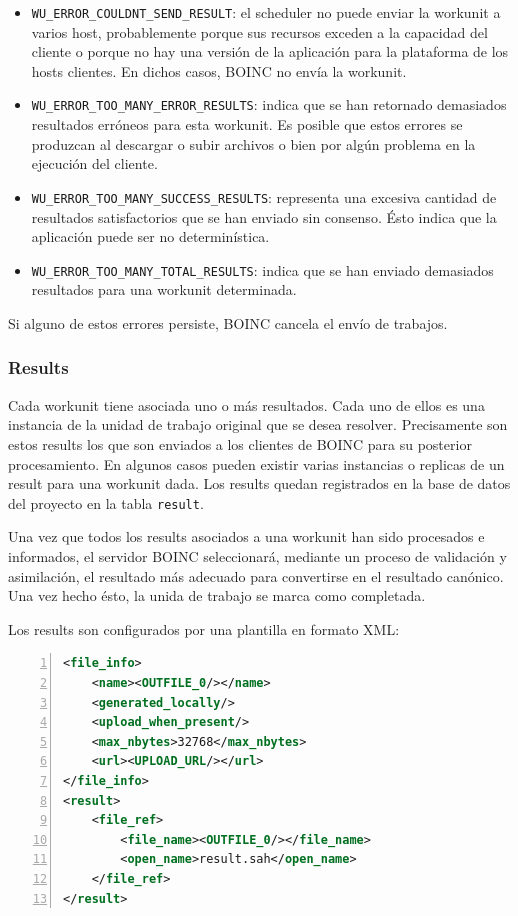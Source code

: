 \begin{itemize}
\item \texttt{WU\_ERROR\_COULDNT\_SEND\_RESULT}: el scheduler no puede enviar la workunit a varios host, probablemente porque sus recursos exceden a la capacidad del cliente o porque no hay una versión de la aplicación para la plataforma de los hosts clientes. En dichos casos, BOINC no envía la workunit.
\item \texttt{WU\_ERROR\_TOO\_MANY\_ERROR\_RESULTS}: indica que se han retornado demasiados resultados erróneos para esta workunit. Es posible que estos errores se produzcan al descargar o subir archivos o bien por algún problema en la ejecución del cliente.
\item \texttt{WU\_ERROR\_TOO\_MANY\_SUCCESS\_RESULTS}: representa una excesiva cantidad de resultados satisfactorios que se han enviado sin consenso. Ésto indica que la aplicación puede ser no determinística.
\item \texttt{WU\_ERROR\_TOO\_MANY\_TOTAL\_RESULTS}: indica que se han enviado demasiados resultados para una workunit determinada.
\end{itemize}

Si alguno de estos errores persiste, BOINC cancela el envío de trabajos.

\subsubsection{Results}

Cada workunit tiene asociada uno o más resultados. Cada uno de ellos es una instancia de la unidad de trabajo original que se desea resolver. Precisamente son estos results los que son enviados a los clientes de BOINC para su posterior procesamiento.
En algunos casos pueden existir varias instancias o replicas de un result para una workunit dada. Los results quedan registrados en la base de datos del proyecto en la tabla \texttt{result}.

Una vez que todos los results asociados a una workunit han sido procesados e informados, el servidor BOINC seleccionará, mediante un proceso de validación y asimilación, el resultado más adecuado para convertirse en el resultado canónico. Una vez hecho ésto, la unida de trabajo se marca como completada.

Los results son configurados por una plantilla en formato XML:
\newpage
\begin{lstlisting}[frame=shadowbox, language=xml, numbers=left, xleftmargin=8mm, framexleftmargin=22pt, basicstyle=\scriptsize, numberstyle=\footnotesize, breaklines=true, breakatwhitespace=false, captionpos=b, caption={Plantilla para la configuración de un result.}, label=listing:boinc:result:template, backgroundcolor=\color{gris}, keywordstyle=\color{Blue}]
<file_info>
    <name><OUTFILE_0/></name>
    <generated_locally/>
    <upload_when_present/>
    <max_nbytes>32768</max_nbytes>
    <url><UPLOAD_URL/></url>
</file_info>
<result>
    <file_ref>
        <file_name><OUTFILE_0/></file_name>
        <open_name>result.sah</open_name>
    </file_ref>
</result>
\end{lstlisting}


